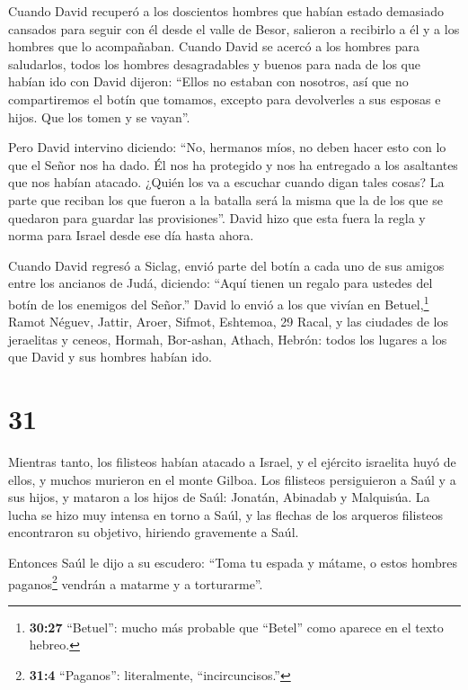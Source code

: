 Cuando David recuperó a los doscientos hombres que habían
estado demasiado cansados para seguir con él desde el valle de Besor,
salieron a recibirlo a él y a los hombres que lo acompañaban. Cuando
David se acercó a los hombres para saludarlos,  todos los
hombres desagradables y buenos para nada de los que habían ido con David
dijeron: ``Ellos no estaban con nosotros, así que no compartiremos el
botín que tomamos, excepto para devolverles a sus esposas e hijos. Que
los tomen y se vayan''.

 Pero David intervino diciendo: ``No, hermanos míos, no
deben hacer esto con lo que el Señor nos ha dado. Él nos ha protegido y
nos ha entregado a los asaltantes que nos habían atacado. 
¿Quién los va a escuchar cuando digan tales cosas? La parte que reciban
los que fueron a la batalla será la misma que la de los que se quedaron
para guardar las provisiones''.  David hizo que esta fuera
la regla y norma para Israel desde ese día hasta ahora.

 Cuando David regresó a Siclag, envió parte del botín a
cada uno de sus amigos entre los ancianos de Judá, diciendo: ``Aquí
tienen un regalo para ustedes del botín de los enemigos del Señor.''
 David lo envió a los que vivían en Betuel,\footnote{\textbf{30:27}
  ``Betuel'': mucho más probable que ``Betel'' como aparece en el texto
  hebreo.} Ramot Néguev, Jattir,  Aroer, Sifmot, Eshtemoa,
29 Racal, y las ciudades de los jeraelitas y ceneos, 
Hormah, Bor-ashan, Athach,  Hebrón: todos los lugares a los
que David y sus hombres habían ido.

\hypertarget{section-30}{%
\section{31}\label{section-30}}

 Mientras tanto, los filisteos habían atacado a Israel, y el
ejército israelita huyó de ellos, y muchos murieron en el monte Gilboa.
 Los filisteos persiguieron a Saúl y a sus hijos, y mataron
a los hijos de Saúl: Jonatán, Abinadab y Malquisúa.  La
lucha se hizo muy intensa en torno a Saúl, y las flechas de los arqueros
filisteos encontraron su objetivo, hiriendo gravemente a Saúl.

 Entonces Saúl le dijo a su escudero: ``Toma tu espada y
mátame, o estos hombres paganos\footnote{\textbf{31:4} ``Paganos'':
  literalmente, ``incircuncisos.''} vendrán a matarme y a torturarme''.

